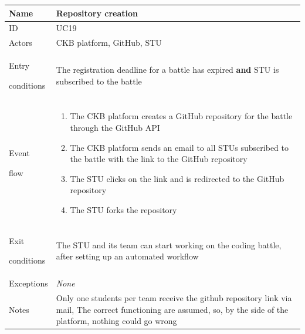 \begin{center}
    \def\arraystretch{1.5}
    \begin{tabular}{| m{2cm} | m{10cm}|}
        \hline
        Name                  & Repository creation                                                                                              \\ \hline
        ID                    & UC19                                                                                                             \\ \hline
        Actors                & CKB platform, GitHub, STU                                                                                        \\ \hline
        Entry \par conditions & The registration deadline for a battle has expired \textbf{and} STU is subscribed to the battle                  \\ \hline
        Event \par flow       & \begin{enumerate}
                                    \item The CKB platform creates a GitHub repository for the battle through the GitHub API
                                    \item The CKB platform sends an email to all STUs subscribed to the battle with the link to the GitHub repository
                                    \item The STU clicks on the link and is redirected to the GitHub repository
                                    \item The STU forks the repository
                                \end{enumerate} \\ \hline
        Exit \par conditions  & The STU and its team can start working on the coding battle, after setting up an automated workflow                                                      \\ \hline
        Exceptions            & \textit{None}                                                                                                    \\ \hline
        Notes                 & Only one students per team receive the github repository  link via mail, The correct functioning are assumed, so, by the side of the platform, nothing could go wrong                     \\ \hline
    \end{tabular}
\end{center}
